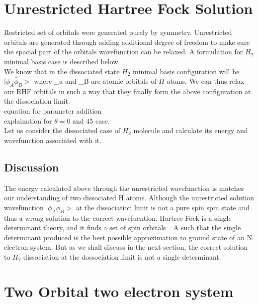\documentclass[11pt]{article}   	%
\begin{document}
\section{Unrestricted Hartree Fock Solution}
	Restricted set of orbitals were generated purely by symmetry. Unrestricted orbitals are generated through adding additional degree of freedom to make sure the spacial part of the orbitals wavefunction 
	can be relaxed. A formulation for $H_2$ minimal basis case is described below. \\
	We know that in the dissociated state $H_2$ minimal basis configuration will be $|\phi_A \bar{\phi}_B>$ where \phi_a and \phi_B are atomic orbitals of $H$ atoms. We can thus relax our RHF orbitals in such a way that they 
	finally form the above configuration at the dissociation limit. \\
	equation for parameter addition \\
	explaination for $\theta =0$ and 45 case. \\
	Let us consider the dissociated case of $H_2$ molecule and calculate its energy and wavefunction associated with it. \\
	
	\subsection{Discussion}
	The energy calculated above through the unrestricted wavefunction is matches our understanding of two dissociated H atoms. Although the unrestricted solution wavefunction $|\phi_A \phi_B> $ at the dissociation limit is not a pure spin 
	spin state and thus a wrong solution to the correct wavefucntion. Hartree Fock is a single determinant theory, and it finds a set of spin orbitals \Ki_A such that the single determinant produced is the best possible approximation to
	ground state of an N electron system. But as we shall discuss in the next section, the correct solution to $H_2$ dissociation at the dossociation limit is not a single determinant. \\
\section{Two Orbital two electron system}%
\end{document}
